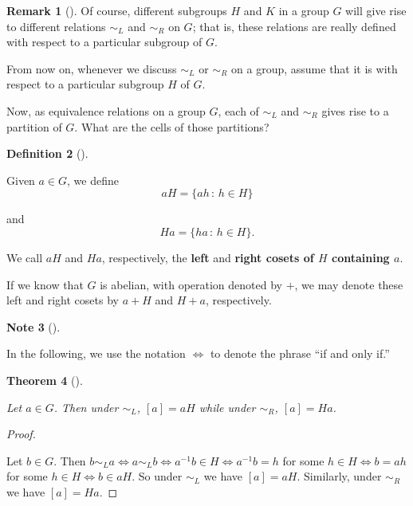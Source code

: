 \documentclass[10pt,]{book}
\newcommand{\terminology}[1]{\textbf{#1}}
\theoremstyle{plain}
\newtheorem{theorem}{Theorem}[section]
\theoremstyle{definition}
\newtheorem{definition}[theorem]{Definition}
\theoremstyle{definition}
\newtheorem{remark}[theorem]{Remark}
\newtheorem{note}[theorem]{Note}
\theoremstyle{definition}
\theoremstyle{definition}
\numberwithin{equation}{section}
\def\siml{\sim_L}
\def\simr{\sim_R}
\begin{document}
\begin{remark}[]\label{remark-38}
 Of course, different subgroups \(H\) and \(K\) in a group \(G\) will give rise to different relations \(\siml\) and \(\simr\) on \(G\); that is, these relations are really defined  with respect to a particular subgroup of \(G\).%
\end{remark}

  From now on, whenever we discuss \(\siml\) or \(\simr\) on a group, assume that it is with respect to a particular subgroup \(H\) of \(G\).%
\par

    Now, as equivalence relations on a group \(G\), each of \(\siml\) and \(\simr\)
    gives rise to a partition of \(G\). What are the cells of those
    partitions?
\begin{definition}[{}]\label{definition-59}

        Given \(a\in G\), we define
\begin{equation*}

          aH =
          \{ah\,:\, h\in H\}
        
\end{equation*}

        and
\begin{equation*}

          Ha=\{ha\,:\,h\in H\}.
        
\end{equation*}

\par

        We call \(aH\) and \(Ha\), respectively, the \terminology{left } and \terminology{right cosets of \(H\) containing
        \(a\)}.

        If we know that \(G\) is abelian, with operation denoted by \(+\), we may denote these left and right cosets by \(a+H\) and \(H+a\), respectively.%

\label{notation-66}
\label{notation-67}
\end{definition}
\begin{note}[]\label{note-10}

  In the following, we use the notation \(\Leftrightarrow\) to denote the phrase ``if and only if.''
%
\label{notation-68}
\end{note}
\begin{theorem}[{}]\label{equivca}

        Let \(a\in G\). Then under \(\siml\), \([a]=aH\) while
        under \(\simr\), \([a]=Ha\).
\end{theorem}
\begin{proof}\hypertarget{proof-38}{}

      Let \(b\in G\). Then \(b\siml a \Leftrightarrow a \siml b
      \Leftrightarrow a^{-1}b\in H \Leftrightarrow a^{-1}b=h\) for some
      \(h\in H \Leftrightarrow b=ah\) for some \(h\in H \Leftrightarrow b\in
      aH\). So under \(\siml\) we have \([a]=aH\). Similarly, under \(\simr\) we
      have \([a]=Ha\).
\end{proof}
\par
\end{document}
